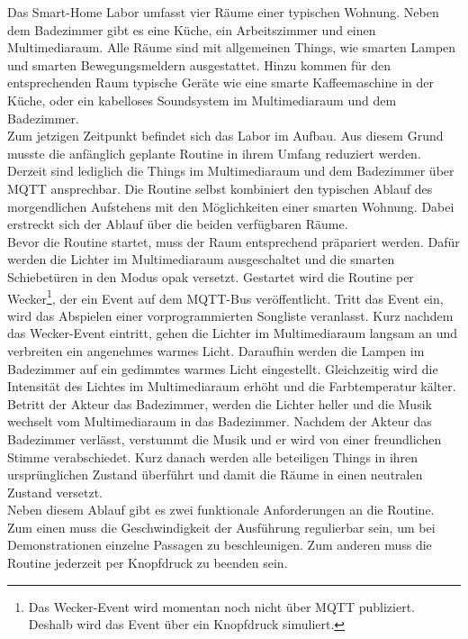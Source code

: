 Das Smart-Home Labor umfasst vier Räume einer typischen Wohnung.
Neben dem Badezimmer gibt es eine Küche, ein Arbeitszimmer und einen Multimediaraum. %
Alle Räume sind mit allgemeinen Things, wie smarten Lampen und smarten Bewegungsmeldern ausgestattet. Hinzu kommen für den entsprechenden Raum typische 
Geräte wie eine smarte Kaffeemaschine in der Küche, oder ein kabelloses Soundsystem im Multimediaraum und dem Badezimmer.\\

Zum jetzigen Zeitpunkt befindet sich das Labor im Aufbau. Aus diesem Grund musste die anfänglich geplante Routine in ihrem Umfang reduziert werden.
Derzeit sind lediglich die Things im Multimediaraum und dem Badezimmer über \ac{MQTT} ansprechbar.
Die Routine selbst kombiniert den typischen Ablauf des morgendlichen Aufstehens mit den Möglichkeiten einer smarten Wohnung.
Dabei erstreckt sich der Ablauf über die beiden verfügbaren Räume.\\

Bevor die Routine startet, muss der Raum entsprechend präpariert werden.
Dafür werden die Lichter im Multimediaraum ausgeschaltet und die smarten Schiebetüren in den Modus opak versetzt.
Gestartet wird die Routine per Wecker\footnote{Das Wecker-Event wird momentan noch nicht über \ac{MQTT} publiziert. Deshalb wird das Event über ein Knopfdruck simuliert.},
der ein Event auf dem \ac{MQTT}-Bus veröffentlicht. Tritt das Event ein, wird das Abspielen einer vorprogrammierten Songliste veranlasst. 
Kurz nachdem das Wecker-Event eintritt, gehen die Lichter im Multimediaraum langsam an und verbreiten ein angenehmes warmes Licht.
Daraufhin werden die Lampen im Badezimmer auf ein gedimmtes warmes Licht eingestellt.
Gleichzeitig wird die Intensität des Lichtes im Multimediaraum erhöht und die Farbtemperatur kälter.
Betritt der Akteur das Badezimmer, werden die Lichter heller und die Musik wechselt vom Multimediaraum in das Badezimmer.
Nachdem der Akteur das Badezimmer verlässt, verstummt die Musik und er wird von einer freundlichen Stimme verabschiedet.
Kurz danach werden alle beteiligen Things in ihren ursprünglichen Zustand überführt und damit die Räume in einen neutralen Zustand versetzt.\\

Neben diesem Ablauf gibt es zwei funktionale Anforderungen an die Routine.
Zum einen muss die Geschwindigkeit der Ausführung regulierbar sein, um bei Demonstrationen einzelne Passagen zu beschleunigen.
Zum anderen muss die Routine jederzeit per Knopfdruck zu beenden sein.\\

